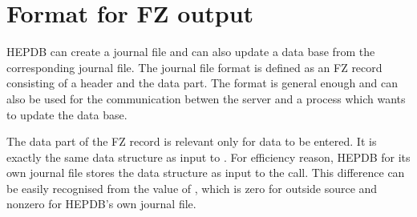 \chapter{Format for FZ output}

HEPDB can create a journal file and can also update a data base from
the corresponding journal file. The journal file format is defined as an
FZ record consisting of a header and the data part. The format is
general enough and can also be used for the communication betwen the
server and a process which wants to update the data base.

The data part of the FZ record is relevant only for data to be
entered. It is exactly the same data structure as input to . For
efficiency reason, HEPDB for its own journal file stores the data
structure as input to the  call. This difference can be easily
recognised from the value of , which is zero for outside source
and nonzero for HEPDB's own journal file.

